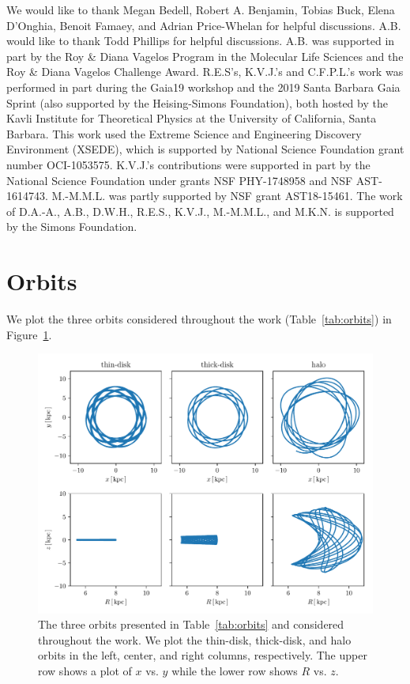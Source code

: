 \documentclass[twocolumn]{aastex62}
\begin{document}
\acknowledgments
We would like to thank Megan Bedell, Robert A. Benjamin, Tobias Buck, Elena
D'Onghia, Benoit Famaey, and Adrian Price-Whelan for helpful discussions. A.B.
would like to thank Todd Phillips for helpful discussions. A.B. was supported
in part by the Roy \& Diana Vagelos Program in the Molecular Life Sciences and
the Roy \& Diana Vagelos Challenge Award. R.E.S's, K.V.J.'s and C.F.P.L.'s work was
performed in part during the Gaia19 workshop and the 2019 Santa Barbara Gaia
Sprint (also supported by the Heising-Simons Foundation), both hosted by the
Kavli Institute for Theoretical Physics at the University of California, Santa
Barbara. This work used the Extreme Science and Engineering Discovery
Environment (XSEDE), which is supported by National Science Foundation grant
number OCI-1053575. K.V.J.'s contributions were supported in part by the
National Science Foundation under grants NSF PHY-1748958 and NSF AST-1614743.
M.-M.M.L. was partly supported by NSF grant AST18-15461. The work of D.A.-A.,
A.B., D.W.H., R.E.S., K.V.J., M.-M.M.L., and M.K.N. is supported by the Simons
Foundation.

\appendix
\section{Orbits} \label{app:orbits}
We plot the three orbits considered throughout the work
(Table~\ref{tab:orbits}) in Figure~\ref{fig:plot_orbits}.

\begin{figure}[htb!]
\begin{center}
\includegraphics[width=\textwidth]{fig/orbits.pdf}
\end{center}
\caption{The three orbits presented in Table~\ref{tab:orbits} and considered
throughout the work. We plot the thin-disk, thick-disk, and halo orbits in the
left, center, and right columns, respectively. The upper row shows a plot of
$x$ vs. $y$ while the lower row shows $R$ vs. $z$.}
\label{fig:plot_orbits}
\end{figure}
\end{document}
